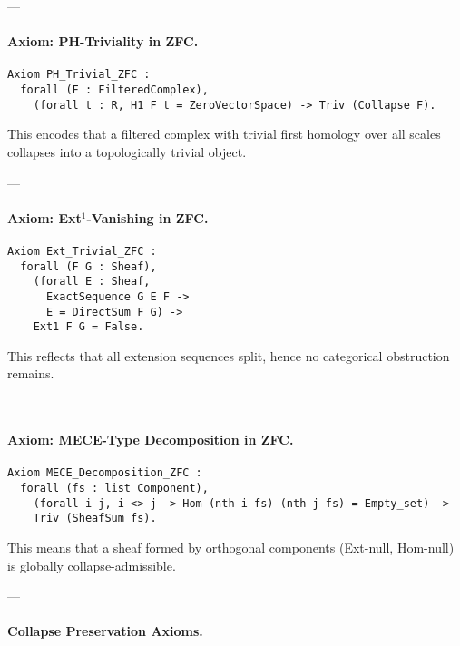 \documentclass[11pt]{article}
\begin{document}
---

\paragraph{Axiom: PH-Triviality in ZFC.}

\noindent
\begin{lstlisting}[language=Coq, breaklines=true]
Axiom PH_Trivial_ZFC :
  forall (F : FilteredComplex),
    (forall t : R, H1 F t = ZeroVectorSpace) -> Triv (Collapse F).
\end{lstlisting}

This encodes that a filtered complex with trivial first homology over all scales  
collapses into a topologically trivial object.

---

\paragraph{Axiom: Ext$^1$-Vanishing in ZFC.}

\noindent
\begin{lstlisting}[language=Coq, breaklines=true]
Axiom Ext_Trivial_ZFC :
  forall (F G : Sheaf),
    (forall E : Sheaf,
      ExactSequence G E F ->
      E = DirectSum F G) ->
    Ext1 F G = False.
\end{lstlisting}

This reflects that all extension sequences split, hence no categorical obstruction remains.

---

\paragraph{Axiom: MECE-Type Decomposition in ZFC.}

\noindent
\begin{lstlisting}[language=Coq, breaklines=true]
Axiom MECE_Decomposition_ZFC :
  forall (fs : list Component),
    (forall i j, i <> j -> Hom (nth i fs) (nth j fs) = Empty_set) ->
    Triv (SheafSum fs).
\end{lstlisting}

This means that a sheaf formed by orthogonal components (Ext-null, Hom-null)  
is globally collapse-admissible.

---

\paragraph{Collapse Preservation Axioms.}
\end{document}
